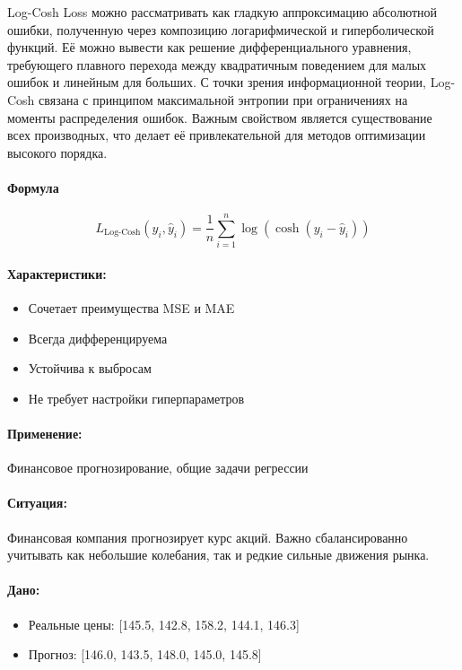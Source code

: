 Log-Cosh Loss можно рассматривать как гладкую аппроксимацию абсолютной ошибки, полученную через композицию логарифмической и гиперболической функций. Её можно вывести как решение дифференциального уравнения, требующего плавного перехода между квадратичным поведением для малых ошибок и линейным для больших. С точки зрения информационной теории, Log-Cosh связана с принципом максимальной энтропии при ограничениях на моменты распределения ошибок. Важным свойством является существование всех производных, что делает её привлекательной для методов оптимизации высокого порядка.

\paragraph{Формула}

\[
    L_{\text{Log-Cosh}}(y_i, \hat{y}_i) = \frac{1}{n} \sum_{i=1}^{n} \log(\cosh(y_i - \hat{y}_i))
\]

\paragraph{Характеристики:}
\begin{itemize}
    \item Сочетает преимущества MSE и MAE
    \item Всегда дифференцируема
    \item Устойчива к выбросам
    \item Не требует настройки гиперпараметров
\end{itemize}

\paragraph{Применение:} Финансовое прогнозирование, общие задачи регрессии

\paragraph{Ситуация:} Финансовая компания прогнозирует курс акций. Важно сбалансированно учитывать как небольшие колебания, так и редкие сильные движения рынка.

\paragraph{Дано:}
\begin{itemize}
    \item Реальные цены: [145.5, 142.8, 158.2, 144.1, 146.3]
    \item Прогноз: [146.0, 143.5, 148.0, 145.0, 145.8]
\end{itemize}

